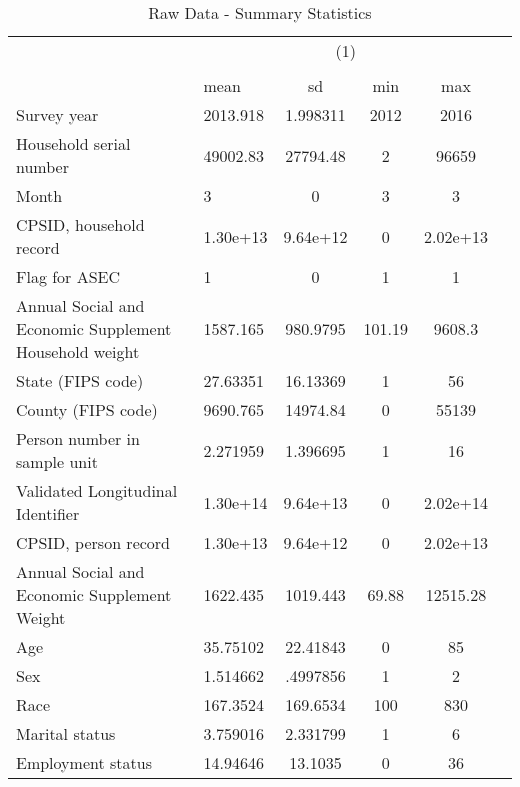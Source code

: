 \begin{table}[htbp]\centering
\def\sym#1{\ifmmode^{#1}\else\(^{#1}\)\fi}
\caption{Raw Data - Summary Statistics}
\begin{tabular}{l*{1}{lcccc}}
\hline\hline
                    &\multicolumn{4}{c}{(1)}                            \\
                    &\multicolumn{4}{c}{}                               \\
                    &        mean&          sd&         min&         max\\
\hline
Survey year         &    2013.918&    1.998311&        2012&        2016\\
Household serial number&    49002.83&    27794.48&           2&       96659\\
Month               &           3&           0&           3&           3\\
CPSID, household record&    1.30e+13&    9.64e+12&           0&    2.02e+13\\
Flag for ASEC       &           1&           0&           1&           1\\
Annual Social and Economic Supplement Household weight&    1587.165&    980.9795&      101.19&      9608.3\\
State (FIPS code)   &    27.63351&    16.13369&           1&          56\\
County (FIPS code)  &    9690.765&    14974.84&           0&       55139\\
Person number in sample unit&    2.271959&    1.396695&           1&          16\\
Validated Longitudinal Identifier&    1.30e+14&    9.64e+13&           0&    2.02e+14\\
CPSID, person record&    1.30e+13&    9.64e+12&           0&    2.02e+13\\
Annual Social and Economic Supplement Weight&    1622.435&    1019.443&       69.88&    12515.28\\
Age                 &    35.75102&    22.41843&           0&          85\\
Sex                 &    1.514662&    .4997856&           1&           2\\
Race                &    167.3524&    169.6534&         100&         830\\
Marital status      &    3.759016&    2.331799&           1&           6\\
Employment status   &    14.94646&     13.1035&           0&          36\\

\end{tabular}
\end{table}
